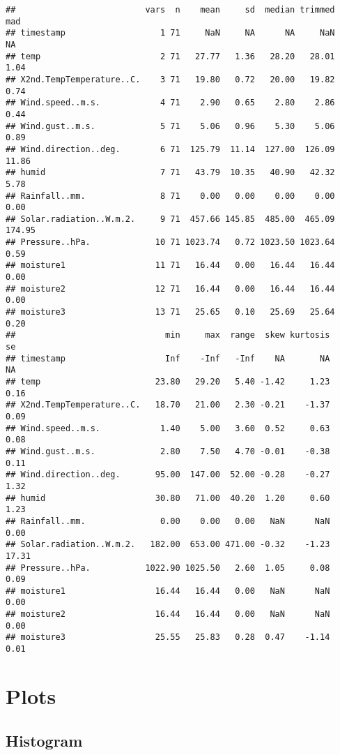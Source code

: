 \documentclass[]{article}
\begin{document}
\begin{verbatim}
##                          vars  n    mean     sd  median trimmed    mad
## timestamp                   1 71     NaN     NA      NA     NaN     NA
## temp                        2 71   27.77   1.36   28.20   28.01   1.04
## X2nd.TempTemperature..C.    3 71   19.80   0.72   20.00   19.82   0.74
## Wind.speed..m.s.            4 71    2.90   0.65    2.80    2.86   0.44
## Wind.gust..m.s.             5 71    5.06   0.96    5.30    5.06   0.89
## Wind.direction..deg.        6 71  125.79  11.14  127.00  126.09  11.86
## humid                       7 71   43.79  10.35   40.90   42.32   5.78
## Rainfall..mm.               8 71    0.00   0.00    0.00    0.00   0.00
## Solar.radiation..W.m.2.     9 71  457.66 145.85  485.00  465.09 174.95
## Pressure..hPa.             10 71 1023.74   0.72 1023.50 1023.64   0.59
## moisture1                  11 71   16.44   0.00   16.44   16.44   0.00
## moisture2                  12 71   16.44   0.00   16.44   16.44   0.00
## moisture3                  13 71   25.65   0.10   25.69   25.64   0.20
##                              min     max  range  skew kurtosis    se
## timestamp                    Inf    -Inf   -Inf    NA       NA    NA
## temp                       23.80   29.20   5.40 -1.42     1.23  0.16
## X2nd.TempTemperature..C.   18.70   21.00   2.30 -0.21    -1.37  0.09
## Wind.speed..m.s.            1.40    5.00   3.60  0.52     0.63  0.08
## Wind.gust..m.s.             2.80    7.50   4.70 -0.01    -0.38  0.11
## Wind.direction..deg.       95.00  147.00  52.00 -0.28    -0.27  1.32
## humid                      30.80   71.00  40.20  1.20     0.60  1.23
## Rainfall..mm.               0.00    0.00   0.00   NaN      NaN  0.00
## Solar.radiation..W.m.2.   182.00  653.00 471.00 -0.32    -1.23 17.31
## Pressure..hPa.           1022.90 1025.50   2.60  1.05     0.08  0.09
## moisture1                  16.44   16.44   0.00   NaN      NaN  0.00
## moisture2                  16.44   16.44   0.00   NaN      NaN  0.00
## moisture3                  25.55   25.83   0.28  0.47    -1.14  0.01
\end{verbatim}

\section{Plots}\label{plots}

\subsection{Histogram}\label{histogram}
\end{document}
